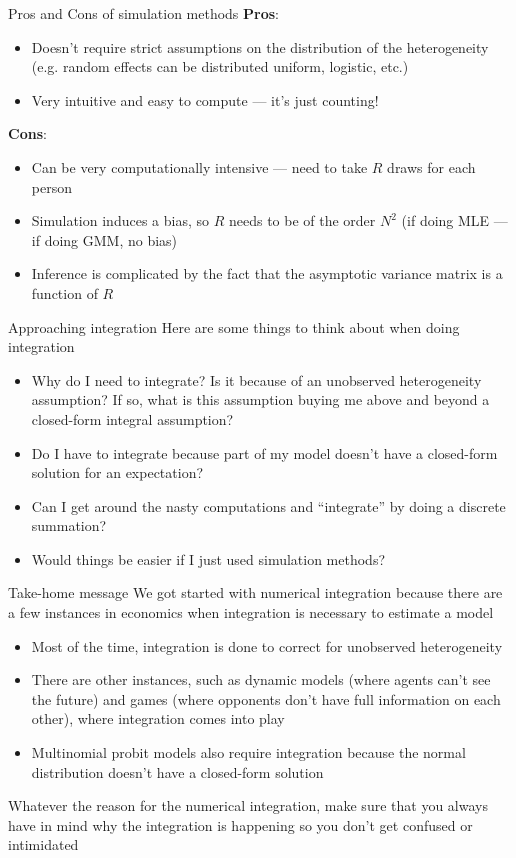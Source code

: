 \documentclass[english,xcolor=dvipsnames]{beamer}
\begin{document}
\begin{frame}{Pros and Cons of simulation methods}
\textbf{Pros}:
\begin{itemize}
	\item Doesn't require strict assumptions on the distribution of the heterogeneity (e.g. random effects can be distributed uniform, logistic, etc.)
	\item Very intuitive and easy to compute --- it's just counting!
\end{itemize}
\textbf{Cons}:
\begin{itemize}
	\item Can be very computationally intensive --- need to take $R$ draws for each person
	\item Simulation induces a bias, so $R$ needs to be of the order $N^2$ (if doing MLE --- if doing GMM, no bias)
	\item Inference is complicated by the fact that the asymptotic variance matrix is a function of $R$
\end{itemize}
\end{frame}

\begin{frame}{Approaching integration}
Here are some things to think about when doing integration
\begin{itemize}
	\item Why do I need to integrate? Is it because of an unobserved heterogeneity assumption? If so, what is this assumption buying me 	above and beyond a closed-form integral assumption?
	\item Do I have to integrate because part of my model doesn't have a closed-form solution for an expectation?
	\item Can I get around the nasty computations and ``integrate'' by doing a discrete summation?
	\item Would things be easier if I just used simulation methods?
\end{itemize}
\end{frame}

\begin{frame}{Take-home message}
We got started with numerical integration because there are a few instances in economics when integration is necessary to estimate a model
\begin{itemize}
	\item Most of the time, integration is done to correct for unobserved heterogeneity
	\item There are other instances, such as dynamic models (where agents can't see the future) and games (where opponents don't have full information on each other), where integration comes into play
	\item Multinomial probit models also require integration because the normal distribution doesn't have a closed-form solution
\end{itemize}
Whatever the reason for the numerical integration, make sure that you always have in mind why the integration is happening so you don't get confused or intimidated
\end{frame}
\end{document}

